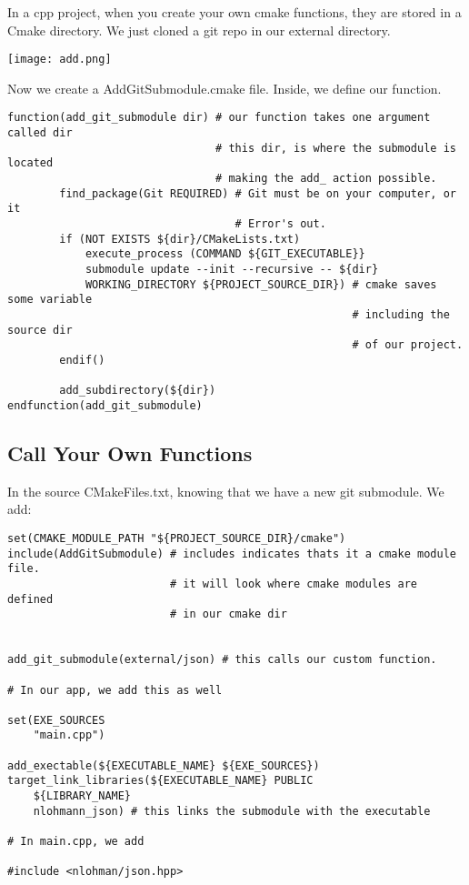\documentclass[openany]{report}
\begin{document}
In a cpp project, when you create your own cmake functions, they are stored in a Cmake directory. We just cloned a 
git repo in our external directory.

\begin{center}
    \texttt{[image: add.png]}
\end{center}

Now we create a AddGitSubmodule.cmake file. Inside, we define our function.

\begin{verbatim}
function(add_git_submodule dir) # our function takes one argument called dir
                                # this dir, is where the submodule is located
                                # making the add_ action possible.
        find_package(Git REQUIRED) # Git must be on your computer, or it
                                   # Error's out.
        if (NOT EXISTS ${dir}/CMakeLists.txt)
            execute_process (COMMAND ${GIT_EXECUTABLE}}
            submodule update --init --recursive -- ${dir}
            WORKING_DIRECTORY ${PROJECT_SOURCE_DIR}) # cmake saves some variable
                                                     # including the source dir
                                                     # of our project.
        endif()

        add_subdirectory(${dir})
endfunction(add_git_submodule)
\end{verbatim}


\subsection{Call Your Own Functions}

In the source CMakeFiles.txt, knowing that we have a new git submodule. We add:


\begin{verbatim}
set(CMAKE_MODULE_PATH "${PROJECT_SOURCE_DIR}/cmake")
include(AddGitSubmodule) # includes indicates thats it a cmake module file.
                         # it will look where cmake modules are defined
                         # in our cmake dir


add_git_submodule(external/json) # this calls our custom function.

# In our app, we add this as well

set(EXE_SOURCES
    "main.cpp")

add_exectable(${EXECUTABLE_NAME} ${EXE_SOURCES})
target_link_libraries(${EXECUTABLE_NAME} PUBLIC
    ${LIBRARY_NAME}
    nlohmann_json) # this links the submodule with the executable

# In main.cpp, we add 

#include <nlohman/json.hpp>
\end{verbatim}
\end{document}
